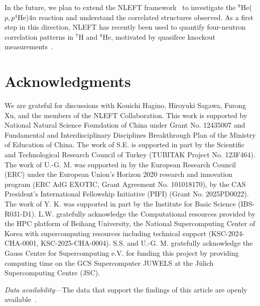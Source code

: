 \documentclass[aps,prl,showpacs,twocolumn,preprintnumbers,superscriptaddress,nofootinbib,floatfix,10pt]{revtex4-1}
\newcommand{\beginsupplement}{
        \setcounter{table}{0}
        \renewcommand{\thetable}{S\arabic{table}}
        \setcounter{figure}{0}
        \renewcommand{\thefigure}{S\arabic{figure}}
        \setcounter{equation}{0}
        \renewcommand{\theequation}{S\arabic{equation}}
     }
\begin{document}
In the future, we plan to extend the NLEFT framework~\cite{Elhatisari:2015iga} to investigate the $^8$He($p,p^4$He)$4n$ reaction and understand the correlated structures observed. As a first step in this direction, NLEFT has recently been used to quantify four-neutron correlation patterns in $^{7}$H and $^{8}$He, motivated by quasifree knockout measurements~\cite{Zhang:2025uin}.




\section{Acknowledgments}
We are grateful for discussions with Kouichi Hagino, Hiroyuki Sagawa, Furong Xu, and the members of the NLEFT Collaboration.
This work is supported by National Natural Science Foundation of China under Grant No. 12435007 and Fundamental and Interdisciplinary Disciplines Breakthrough Plan of the Ministry of Education of China. The work of S.E. is supported in part by the Scientific and Technological Research Council of Turkey (TUBITAK Project No. 123F464). The work of U.-G. M. was supported in by the European Research Council (ERC) under the
European Union’s Horizon 2020 research and innovation program (ERC AdG EXOTIC, Grant Agreement No. 101018170), by the CAS President’s International Fellowship Initiative (PIFI) (Grant No. 2025PD0022). The work of Y. K. was supported in part by the Institute for Basic Science (IBS-R031-D1). L.W. gratefully acknowledge the Computational resources provided by the HPC platform of Beihang University, the National Supercomputing Center of Korea with supercomputing resources including technical support (KSC-2024-CHA-0001, KSC-2025-CHA-0004). S.S. and U.-G. M. gratefully acknowledge the Gauss Centre for Supercomputing e.V. for funding this project by providing computing time on the GCS Supercomputer JUWELS at the J\"ulich Supercomputing Centre (JSC).

\emph{Data availability}---The data that support the findings of this article are openly available~\cite{Wu2026}.











\clearpage

\beginsupplement

\begin{bibunit}[apsrev4-2]



\end{bibunit}
\end{document}
